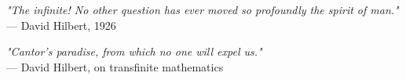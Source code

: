 
\begin{flushright}
\emph{"The infinite! No other question has ever moved so profoundly the spirit of man."}\\
— David Hilbert, 1926
\end{flushright}
\vspace{2em}
\begin{flushright}
\emph{"Cantor's paradise, from which no one will expel us."}\\
— David Hilbert, on transfinite mathematics
\end{flushright}
